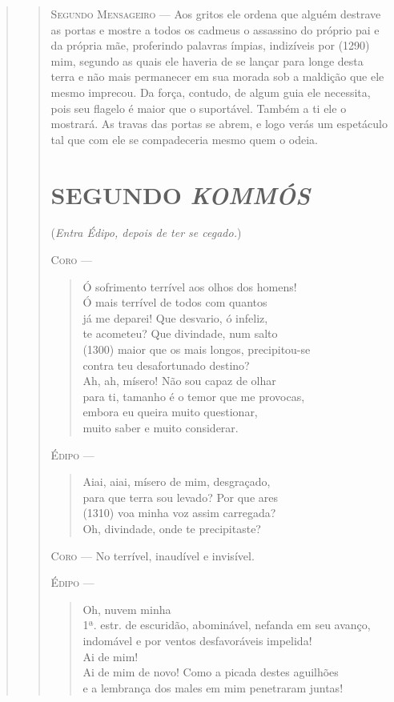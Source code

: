 \begin{verse}
\begin{verse}
\textsc{Segundo Mensageiro} --- Aos gritos ele ordena que alguém destrave as portas e mostre a todos os
cadmeus o assassino do próprio pai e da própria mãe, proferindo palavras
ímpias, indizíveis por (1290) mim, segundo as quais ele haveria de se
lançar para longe desta terra e não mais permanecer em sua morada sob a
maldição que ele mesmo imprecou. Da força, contudo, de algum guia ele
necessita, pois seu flagelo é maior que o suportável. Também a ti ele o
mostrará. As travas das portas se abrem, e logo verás um espetáculo tal
que com ele se compadeceria mesmo quem o odeia.


\section{SEGUNDO \emph{KOMMÓS}}

(\emph{Entra Édipo, depois de ter se cegado.})

\textsc{Coro} --- \begin{verse}Ó sofrimento terrível aos olhos dos homens!\\
Ó mais terrível de todos com quantos\\
já me deparei! Que desvario, ó infeliz,\\
te acometeu? Que divindade, num salto\\ (1300)
maior que os mais longos, precipitou-se\\
contra teu desafortunado destino?\\
Ah, ah, mísero! Não sou capaz de olhar\\
para ti, tamanho é o temor que me provocas,\\
embora eu queira muito questionar,\\
muito saber e muito considerar.
\end{verse}

\textsc{Édipo} --- \begin{verse}Aiai, aiai, mísero de mim, desgraçado,\\
para que terra sou levado? Por que ares\\ (1310)
voa minha voz assim carregada?\\
Oh, divindade, onde te precipitaste?
\end{verse}

\textsc{Coro} --- No terrível, inaudível e invisível.

\textsc{Édipo} --- \begin{verse}Oh, nuvem minha\\ 1ª. estr.
de escuridão, abominável, nefanda em seu avanço,\\
indomável e por ventos desfavoráveis impelida!\\
Ai de mim!\\
Ai de mim de novo! Como a picada destes aguilhões\\
e a lembrança dos males em mim penetraram juntas!
\end{verse}


\end{verse}
\end{verse}
